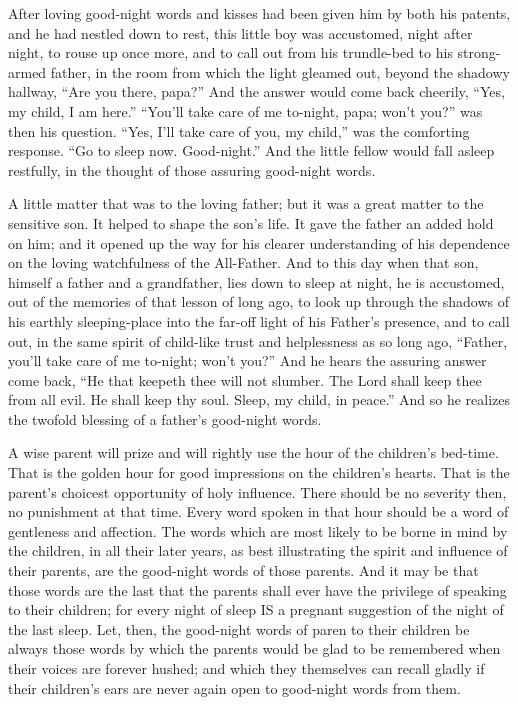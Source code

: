 \documentclass[
]{book}
\begin{document}
After loving good-night words and kisses had been given him by both his patents, and he had nestled down to rest, this little boy was accustomed, night after night, to rouse up once more, and to call out from his trundle-bed to his strong-armed father, in the room from which the light gleamed out, beyond the shadowy hallway, ``Are you there, papa?'' And the answer would come back cheerily, ``Yes, my child, I am here.'' ``You'll take care of me to-night, papa; won't you?'' was then his question. ``Yes, I'll take care of you, my child,'' was the comforting response. ``Go to sleep now. Good-night.'' And the little fellow would fall asleep restfully, in the thought of those assuring good-night words.

A little matter that was to the loving father; but it was a great matter to the sensitive son. It helped to shape the son's life. It gave the father an added hold on him; and it opened up the way for his clearer understanding of his dependence on the loving watchfulness of the All-Father. And to this day when that son, himself a father and a grandfather, lies down to sleep at night, he is accustomed, out of the memories of that lesson of long ago, to look up through the shadows of his earthly sleeping-place into the far-off light of his Father's presence, and to call out, in the same spirit of child-like trust and helplessness as so long ago, ``Father, you'll take care of me to-night; won't you?'' And he hears the assuring answer come back, ``He that keepeth thee will not slumber. The Lord shall keep thee from all evil. He shall keep thy soul. Sleep, my child, in peace.'' And so he realizes the twofold blessing of a father's good-night words.

A wise parent will prize and will rightly use the hour of the children's bed-time. That is the golden hour for good impressions on the children's hearts. That is the parent's choicest opportunity of holy influence. There should be no severity then, no punishment at that time. Every word spoken in that hour should be a word of gentleness and affection. The words which are most likely to be borne in mind by the children, in all their later years, as best illustrating the spirit and influence of their parents, are the good-night words of those parents. And it may be that those words are the last that the parents shall ever have the privilege of speaking to their children; for every night of sleep IS a pregnant suggestion of the night of the last sleep. Let, then, the good-night words of paren to their children be always those words by which the parents would be glad to be remembered when their voices are forever hushed; and which they themselves can recall gladly if their children's ears are never again open to good-night words from them.
\end{document}
